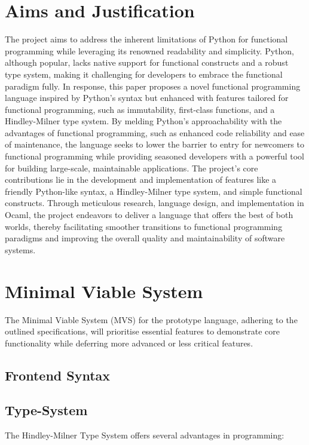 \documentclass{l4proj}
\begin{document}
\section{Aims and Justification}

The project aims to address the inherent limitations of Python for functional programming while leveraging its renowned readability and simplicity.
Python, although popular, lacks native support for functional constructs and a robust type system, making it challenging for developers to embrace the functional paradigm fully.
In response, this paper proposes a novel functional programming language inspired by Python's syntax but enhanced with features tailored for functional programming, such as immutability, first-class functions, and a Hindley-Milner type system.
By melding Python's approachability with the advantages of functional programming, such as enhanced code reliability and ease of maintenance, the language seeks to lower the barrier to entry for newcomers to functional programming while providing seasoned developers with a powerful tool for building large-scale, maintainable applications.
The project's core contributions lie in the development and implementation of features like a friendly Python-like syntax, a Hindley-Milner type system, and simple functional constructs.
Through meticulous research, language design, and implementation in Ocaml, the project endeavors to deliver a language that offers the best of both worlds, thereby facilitating smoother transitions to functional programming paradigms and improving the overall quality and maintainability of software systems.






\section{Minimal Viable System}

The Minimal Viable System (MVS) for the prototype language, adhering to the outlined specifications, will prioritise essential features to demonstrate core functionality while deferring more advanced or less critical features. 

\subsection{Frontend Syntax}



\subsection{Type-System}
The Hindley-Milner Type System offers several advantages in programming:
\end{document}
